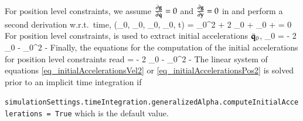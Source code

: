 For position level constraints, we assume $\frac{\partial \mathbf{g}}{\partial \dot {\mathbf{q}}} = 0$ and $\frac{\partial \mathbf{g}}{\partial \mathbf{y}} = 0$ in  and perform a second derivation w.r.t.\ time,
\be \label{eq_initialAccelerationsPos}
	\ddot \gv(\qv_0, \dot \qv_0, \yv_0, \tlambda_0, t) = 
	 \dot \qv_0^2 + 
	2  \dot \qv_0 + 
	\frac{\partial \gv}{\partial \qv} \ddot \qv_0 + 
	 = 0 \eqDot
\ee
For position level constraints,  is used to extract initial accelerations $\ddot {\mathbf{q}}_0$,
\be
  \frac{\partial \gv}{\partial \qv} \ddot \qv_0 = %
	- 2  \dot \qv_0
	-  \dot \qv_0^2
	-  \eqDot
\ee
Finally, the equations for the computation of the initial accelerations for position level constraints read
\be \label{eq_initialAccelerationsPos2}
	   {\Null}{\Im}{\Null}
		 {\frac{\partial \gv}{\partial \qv} }{\Null}{\Null}
   = 
	      {- 2  \dot \qv_0 -  \dot \qv_0^2	- }  \eqComma
\ee
The linear system of equations \ref{eq_initialAccelerationsVel2} or \ref{eq_initialAccelerationsPos2} is solved prior to an implicit time integration if 
\bi
  \item[] \texttt{simulationSettings.timeIntegration.generalizedAlpha.computeInitialAccelerations = True} 
\ei
which is the default value.
%
